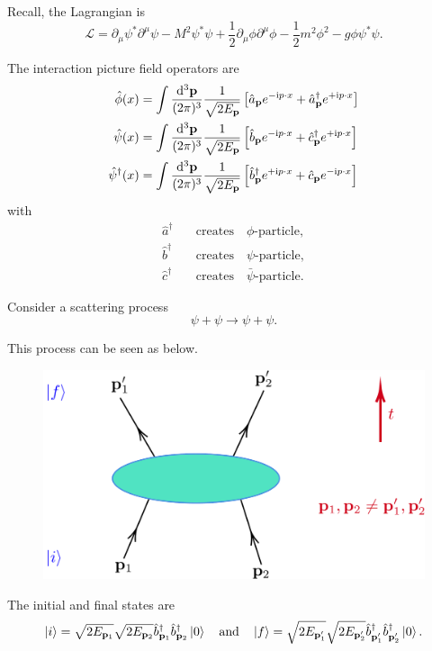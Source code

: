 \documentclass[a4paper,11pt]{article}
\begin{document}
	Recall, the Lagrangian is 
	\[
		\mathcal{L} = \partial_\mu \psi^* \partial^\mu \psi - M^2 \psi^* \psi + \frac{1}{2} \partial_\mu \phi \partial^\mu \phi - \frac{1}{2} m^2 \phi^2 - g \phi \psi^* \psi.
	\]
	
	The interaction picture field operators are
	\begin{align*}
		\hat \phi(x) &= \int \frac{\dd[3]{\vb p}}{(2\pi)^{3}} \frac{1}{\sqrt{2 E _{\vb p}}} \left[ \hat a _{\vb p} e ^{- \mathrm{i} p \cdot x} + \hat a^{\dagger}_{\vb p} e ^{+ \mathrm{i} p \cdot x} \right]\\
		\hat \psi(x) &= \int \frac{\dd[3]{\vb p}}{(2\pi)^{3}} \frac{1}{\sqrt{2 E _{\vb p}}} \left[ \hat b _{\vb p} e ^{- \mathrm{i} p \cdot x} + \hat c^{\dagger}_{\vb p} e ^{+ \mathrm{i} p \cdot x} \right]\\
		\hat \psi^{\dagger}(x) &= \int \frac{\dd[3]{\vb p}}{(2\pi)^{3}} \frac{1}{\sqrt{2 E _{\vb p}}} \left[ \hat b^{\dagger} _{\vb p} e ^{+ \mathrm{i} p \cdot x} + \hat c_{\vb p} e ^{- \mathrm{i} p \cdot x} \right]
	\end{align*}
	with
	\begin{align*}
		\hat a^{\dagger} \quad &\text{creates} \quad \text{$\phi$-particle},\\
		\hat b^{\dagger} \quad &\text{creates} \quad \text{$\psi$-particle},\\
		\hat c^{\dagger} \quad &\text{creates} \quad \text{$\bar \psi$-particle}.
	\end{align*}
	
	Consider a scattering process
	\[
		\psi + \psi \to \psi + \psi.
	\]

	This process can be seen as below.
	
	\begin{figure}[H]
		\centering
		\includegraphics[width=0.5\linewidth]{fig/psi-psi-scattering.pdf}
	\end{figure}

	The initial and final states are
	\[
		\ket{i} = \sqrt{2 E _{\vb p_1}} \sqrt{2 E _{\vb p_2}} \hat b^{\dagger}_{\vb p_1} \hat b^{\dagger}_{\vb p_2} \ket{0} \quad \text{and} \quad \ket{f} = \sqrt{2 E _{\vb p'_1}} \sqrt{2 E _{\vb p'_2}} \hat b^{\dagger} _{\vb p'_1} \hat b^{\dagger}_{\vb p'_2} \ket{0}.
	\]
	
\end{document}
